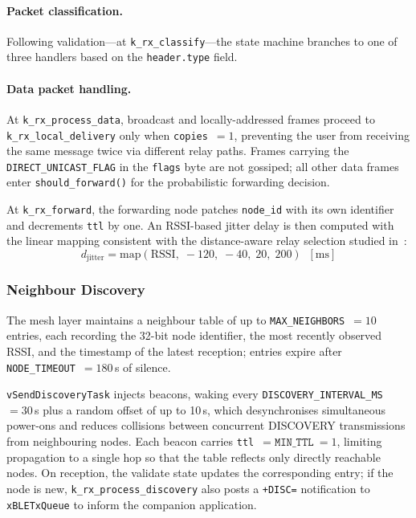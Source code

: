 \documentclass[english,bachelor]{tfgitic}[2026/01/22]
\begin{document}
\paragraph{Packet classification.}
Following validation---at \texttt{k\_rx\_classify}---the state machine branches to one of three handlers based on the \texttt{header.type} field.

\paragraph{Data packet handling.}
At \texttt{k\_rx\_process\_data}, broadcast and locally-addressed frames proceed to
\texttt{k\_rx\_local\_delivery} only when \texttt{copies}~$= 1$, preventing the user
from receiving the same message twice via different relay paths. Frames carrying the
\texttt{DIRECT\_UNICAST\_FLAG} in the \texttt{flags} byte are not gossiped; all other
data frames enter \texttt{should\_forward()} for the probabilistic forwarding
decision.

At \texttt{k\_rx\_forward}, the forwarding node patches \texttt{node\_id} with its
own identifier and decrements \texttt{ttl} by one. An RSSI-based jitter delay is then
computed with the linear mapping consistent with the
distance-aware relay selection studied in~\cite{senel2011relay}:
\[
    d_{\mathrm{jitter}} = \mathrm{map}(\mathrm{RSSI},\; -120,\; -40,\; 20,\; 200)\;\;\mathrm{[ms]}
\]

\subsubsection{Neighbour Discovery}
\label{sec:fw_discovery}

The mesh layer maintains a neighbour table of up to \texttt{MAX\_NEIGHBORS}~$= 10$
entries, each recording the 32-bit node identifier, the most recently observed RSSI,
and the timestamp of the latest reception; entries expire after
\texttt{NODE\_TIMEOUT}~$= 180$\,s of silence.

\texttt{vSendDiscoveryTask} injects beacons, waking every
\texttt{DISCOVERY\_INTERVAL\_MS}~$= 30$\,s plus a random offset of up to 10\,s,
which desynchronises simultaneous power-ons and reduces collisions between
concurrent DISCOVERY transmissions from neighbouring nodes. Each beacon carries
\texttt{ttl}~$= \texttt{MIN\_TTL}~= 1$, limiting propagation to a single hop so that
the table reflects only directly reachable nodes. On reception, the validate state
updates the corresponding entry; if the node is new, \texttt{k\_rx\_process\_discovery}
also posts a \texttt{+DISC=} notification to \texttt{xBLETxQueue} to inform
the companion application.
\end{document}
